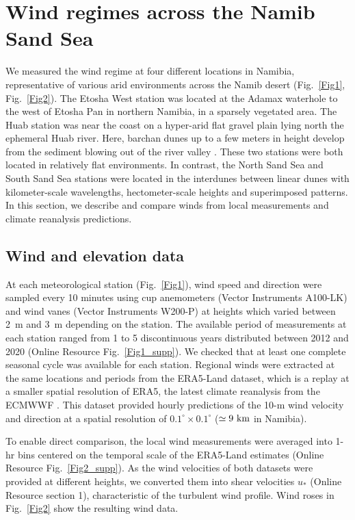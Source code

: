 \section{Wind regimes across the Namib Sand Sea}
We measured the wind regime at four different locations in Namibia, representative of various arid environments across the Namib desert (Fig.~\ref{Fig1}, Fig.~\ref{Fig2}). The Etosha West station was located at the Adamax waterhole to the west of Etosha Pan in northern Namibia, in a sparsely vegetated area. The Huab station was near the coast on a hyper-arid flat gravel plain lying north the ephemeral Huab river. Here, barchan dunes up to a few meters in height develop from the sediment blowing out of the river valley \citep{Nield2017, Hesp1998}. These two stations were both located in relatively flat environments. In contrast, the North Sand Sea and South Sand Sea stations were located in the interdunes between linear dunes with kilometer-scale wavelengths, hectometer-scale heights and superimposed patterns. In this section, we describe and compare winds from local measurements and climate reanalysis predictions.

\subsection{Wind and elevation data}
At each meteorological station (Fig.~\ref{Fig1}), wind speed and direction were sampled every 10 minutes using cup anemometers (Vector Instruments A100-LK) and wind vanes (Vector Instruments W200-P) at heights which varied between 2~m and 3~m depending on the station. The available period of measurements at each station ranged from 1 to 5 discontinuous years distributed between 2012 and 2020 (Online Resource Fig.~\ref{Fig1_supp}). We checked that at least one complete seasonal cycle was available for each station. Regional winds were extracted at the same locations and periods from the ERA5-Land dataset, which is a replay at a smaller spatial resolution of ERA5, the latest climate reanalysis from the ECMWWF \citep{Hersbach2020, munoz2021}. This dataset provided hourly predictions of the 10-m wind velocity and direction at a spatial resolution of $0.1^\circ\times0.1^\circ$ ($\simeq 9~\textup{km}$ in Namibia).

To enable direct comparison, the local wind measurements were averaged into 1-hr bins centered on the temporal scale of the ERA5-Land estimates (Online Resource Fig.~\ref{Fig2_supp}). As the wind velocities of both datasets were provided at different heights, we converted them into shear velocities $u_{*}$ (Online Resource section 1), characteristic of the turbulent wind profile. Wind roses in Fig.~\ref{Fig2} show the resulting wind data.

